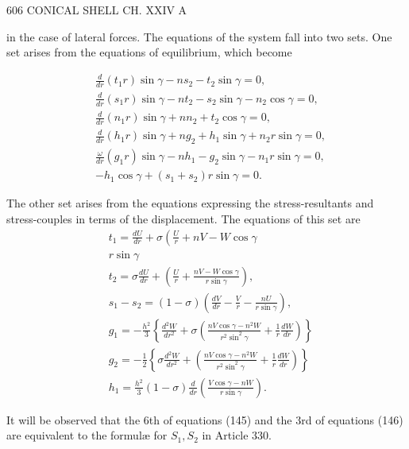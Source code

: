 606 CONICAL SHELL CH. XXIV A %

in the case of lateral forces. The equations of the system fall into two
sets. One set arises from the equations of equilibrium, which become

\[\begin{aligned}
& \frac{d}{d r}\left(t_1 r\right) \sin \gamma-n s_2-t_2 \sin \gamma=0, \\
& \frac{d}{d r}\left(s_1 r\right) \sin \gamma-n t_2-s_2 \sin \gamma-n_2 \cos \gamma=0, \\
& \frac{d}{d r}\left(n_1 r\right) \sin \gamma+n n_2+t_2 \cos \gamma=0, \\
& \frac{d}{d r}\left(h_1 r\right) \sin \gamma+n g_2+h_1 \sin \gamma+n_2 r \sin \gamma=0, \\
& \frac{\omega}{d r}\left(g_1 r\right) \sin \gamma-n h_1-g_2 \sin \gamma-n_1 r \sin \gamma=0, \\
& -h_1 \cos \gamma+\left(s_1+s_2\right) r \sin \gamma=0 .
\end{aligned}\]

The other set arises from the equations expressing the stress-resultants
and stress-couples in terms of the displacement. The equations of this set are
\[\begin{aligned}
& t_1=\frac{d U}{d r}+\sigma\left(\frac{U}{r}+n V-W \cos \gamma\right. \\
& r \sin \gamma \\
& t_2=\sigma \frac{d U}{d r}+\left(\frac{U}{r}+\frac{n V-W \cos \gamma}{r \sin \gamma}\right), \\
& s_1-s_2=(1-\sigma)\left(\frac{d V}{d r}-\frac{V}{r}-\frac{n U}{r \sin \gamma}\right), \\
& g_1=-\frac{h^2}{3}\left\{\frac{d^2 W}{d r^2}+\sigma\left(\frac{n V \cos \gamma-n^2 W}{r^2 \sin ^2 \gamma}+\frac{1}{r} \frac{d W}{d r}\right)\right\} \\
& g_2=-\frac{1}{2}\left\{\sigma \frac{d^2 W}{d r^2}+\left(\frac{n V \cos \gamma-n^2 W}{r^2 \sin ^2 \gamma}+\frac{1}{r} \frac{d W}{d r}\right)\right\} \\
& h_1=\frac{h^2}{3}(1-\sigma) \frac{d}{d r}\left(\frac{V \cos \gamma-n W}{r \sin \gamma}\right) .
\end{aligned}\]

It will be observed that the 6th of equations (145) and the 3rd of
equations (146) are equivalent to the formulæ for \(S_1, S_2\) in
Article 330.

